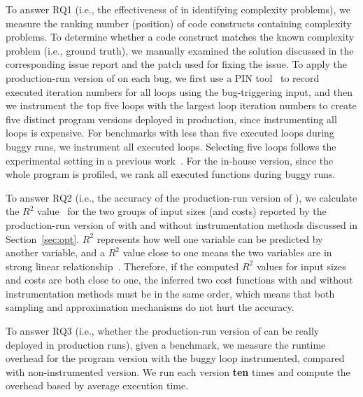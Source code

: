 To answer RQ1 (i.e., the effectiveness of  \Tool in identifying
complexity problems), we measure the ranking number (position) of code
constructs containing complexity problems. 
To determine whether a code construct matches
the known complexity problem (i.e., ground truth), 
we manually examined the solution discussed 
in the corresponding issue 
report and the patch used for fixing the issue. 
To apply the production-run version of \Tool on each bug,
we first use a PIN tool~\cite{pin} to record executed iteration 
numbers for all loops using the bug-triggering input,
and then we instrument the top five loops with the largest loop 
iteration numbers to create five distinct program versions
deployed in production, 
since instrumenting all loops is expensive. 
For benchmarks with less than five executed 
loops during buggy runs, 
we instrument all executed loops. Selecting five loops follows the 
experimental setting in a previous work~\cite{ldoctor}.
For the in-house version, since the whole program is profiled, 
we rank all executed functions during buggy runs. 


To answer RQ2 (i.e., the accuracy of the production-run version of \Tool),
we calculate the $R^2$ value~\cite{rsquare} 
for the two groups of input sizes (and costs) reported by 
the production-run version of \Tool with and without 
instrumentation methods discussed in Section~\ref{sec:opt}.
$R^2$ represents how well one variable can be predicted by another variable,
and a $R^2$ value close to one means the two variables are 
in strong linear relationship~\cite{rsquare-value}.
Therefore, if the computed $R^2$ values for input sizes and costs
are both close to one,
the inferred two cost functions with and without instrumentation 
methods must be in the same order, 
which means that both sampling and approximation mechanisms 
do not hurt the accuracy. 



To answer RQ3 (i.e., whether the production-run version of \Tool 
can be really deployed in production runs), given a benchmark,
we measure the runtime overhead for the program version 
with the buggy loop instrumented, compared with non-instrumented version. 
We run each version \textbf{ten} times and compute the overhead based 
by average execution time. 



